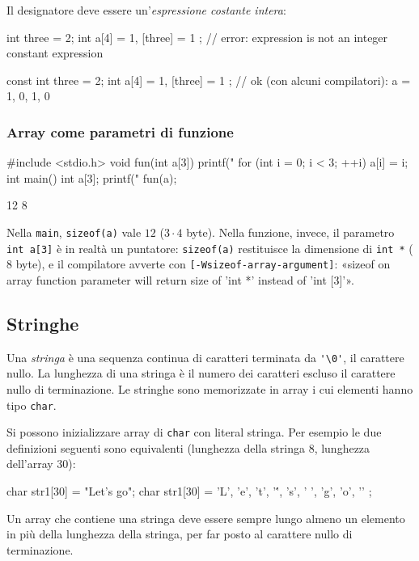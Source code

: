 \documentclass[11pt,a4paper]{article}
\begin{document}
Il designatore deve essere un'\emph{espressione costante intera}:
\begin{codice}
int three = 2;
int a[4] = { 1, [three] = 1 };
// error: expression is not an integer constant expression
\end{codice}
\begin{codice}
const int three = 2;
int a[4] = { 1, [three] = 1 };
// ok (con alcuni compilatori): a = { 1, 0, 1, 0 }
\end{codice}

\subsubsection{Array come parametri di funzione}

\begin{esempio}
\begin{codice}
#include <stdio.h>
void fun(int a[3]) {
    printf("%
    for (int i = 0; i < 3; ++i)
        a[i] = i;
}
int main() {
    int a[3];
    printf("%
    fun(a);
}
\end{codice}
\begin{risultato}
12
8
\end{risultato}
Nella \lstinline|main|, \lstinline|sizeof(a)| vale $12$ ($3 \cdot 4$ byte). Nella funzione, invece, il parametro \lstinline|int a[3]| è in realtà un puntatore: \lstinline|sizeof(a)| restituisce la dimensione di \lstinline|int *| ($8$ byte), e il compilatore avverte con \texttt{[-Wsizeof-array-argument]}: «sizeof on array function parameter will return size of 'int *' instead of 'int [3]'».
\end{esempio}

\subsection{Stringhe}

Una \emph{stringa} è una sequenza continua di caratteri terminata da \lstinline|'\0'|, il carattere nullo. La lunghezza di una stringa è il numero dei caratteri escluso il carattere nullo di terminazione. Le stringhe sono memorizzate in array i cui elementi hanno tipo \lstinline|char|.

Si possono inizializzare array di \lstinline|char| con literal stringa. Per esempio le due definizioni seguenti sono equivalenti (lunghezza della stringa $8$, lunghezza dell'array $30$):
\begin{codice}
char str1[30] = "Let's go";
char str1[30] = { 'L', 'e', 't', '\'', 's', ' ', 'g', 'o', '\0' };
\end{codice}
Un array che contiene una stringa deve essere sempre lungo almeno un elemento in più della lunghezza della stringa, per far posto al carattere nullo di terminazione.
\end{document}
